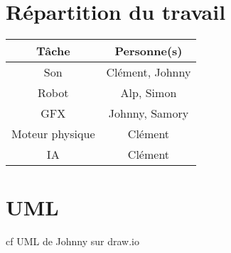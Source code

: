 \documentclass[10pt]{article}
\begin{document}
\section{Répartition du travail}

\begin{tabular}{| c | c |}

\hline
Tâche & Personne(s) \\
\hline
Son & Clément, Johnny \\
\hline
Robot & Alp, Simon \\
\hline
GFX & Johnny, Samory \\
\hline
Moteur physique & Clément \\
\hline
IA & Clément \\
\hline

\end{tabular}



\section{UML}
cf UML de Johnny sur draw.io
\end{document}
